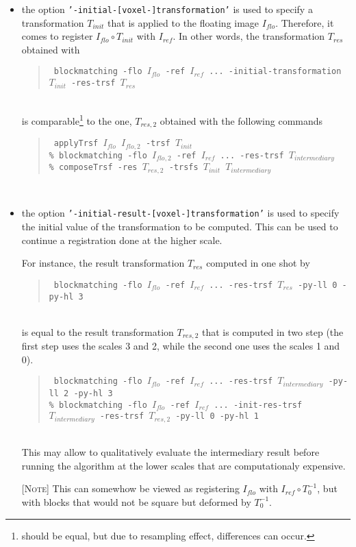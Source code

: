 \documentclass[10pt]{report}
\def\applyTrsf{\texttt{applyTrsf} }
\def\blockmatching{\texttt{blockmatching} }
\def\composeTrsf{\texttt{composeTrsf} }
\newenvironment{note}{\noindent \textsc{[Note]}}{}
\newcommand{\option}[1]{{\texttt{'#1'}}}
\newenvironment{code}[1]{\mbox{}\\[1ex]\hspace*{-#1cm}\begin{minipage}{150mm}\begin{quote}\tt}{\end{quote}\end{minipage}\mbox{}\\[1ex]}
\begin{document}
\begin{itemize}

\item the option \option{-initial-[voxel-]transformation} is used to specify a transformation $T_{init}$ that is applied to the floating image $I_{flo}$. Therefore, it comes to register $I_{flo} \circ T_{init}$ with $I_{ref}$. 
In other words, the transformation $T_{res}$ obtained with
\begin{code}{1}
\% \blockmatching -flo $I_{flo}$ -ref $I_{ref}$ ... -initial-transformation $T_{init}$  -res-trsf $T_{res}$
\end{code}
is comparable\footnote{should be equal, but due to resampling effect, differences can occur.} to the one, $T_{res,2}$ obtained with the following commands
\begin{code}{1}
\% \applyTrsf $I_{flo}$ $I_{flo,2}$ -trsf $T_{init}$ \\
\% \blockmatching -flo $I_{flo,2}$ -ref $I_{ref}$ ... -res-trsf $T_{intermediary}$ \\
\% \composeTrsf -res $T_{res,2}$ -trsfs $T_{init}$ $T_{intermediary}$ 
\end{code}

\item the option \option{-initial-result-[voxel-]transformation} is used to specify the initial value of the transformation to be computed. This can be used to continue a registration done at the higher scale.

For instance, the result transformation $T_{res}$ computed in one shot by
\begin{code}{1}
\% \blockmatching -flo $I_{flo}$ -ref $I_{ref}$ ...  -res-trsf $T_{res}$ -py-ll 0 -py-hl 3
\end{code}
is equal to the result transformation $T_{res,2}$ that is computed in two step (the first step uses the scales 3 and 2, while the second one uses the scales 1 and 0).
\begin{code}{1}
\% \blockmatching -flo $I_{flo}$ -ref $I_{ref}$ ...  -res-trsf $T_{intermediary}$ -py-ll 2 -py-hl 3 \\
\% \blockmatching -flo $I_{flo}$ -ref $I_{ref}$ ...  -init-res-trsf $T_{intermediary}$ -res-trsf $T_{res,2}$ -py-ll 0 -py-hl 1
\end{code}
This may allow to qualitatively evaluate the intermediary result before running the algorithm at the lower scales that are computationaly expensive.

\begin{note}
This can somewhow be viewed as registering $I_{flo}$ with $I_{ref} \circ T^{-1}_{0}$, but with blocks that would not be square but deformed by $T^{-1}_{0}$.
\end{note}

\end{itemize}
\end{document}
